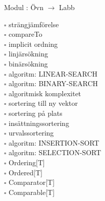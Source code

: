 
Modul : Övn  $\rightarrow$ Labb 
\begin{multicols}{3}\SlideFontTiny
$\square$ strängjämförelse \\
$\square$ compareTo \\
$\square$ implicit ordning \\
$\square$ linjärsökning \\
$\square$ binärsökning \\
$\square$ algoritm: LINEAR-SEARCH \\
$\square$ algoritm: BINARY-SEARCH \\
$\square$ algoritmisk komplexitet \\
$\square$ sortering till ny vektor \\
$\square$ sortering på plats \\
$\square$ insättningssortering \\
$\square$ urvalssortering \\
$\square$ algoritm: INSERTION-SORT \\
$\square$ algoritm: SELECTION-SORT \\
$\square$ Ordering[T] \\
$\square$ Ordered[T] \\
$\square$ Comparator[T] \\
$\square$ Comparable[T] \\     
\end{multicols}
